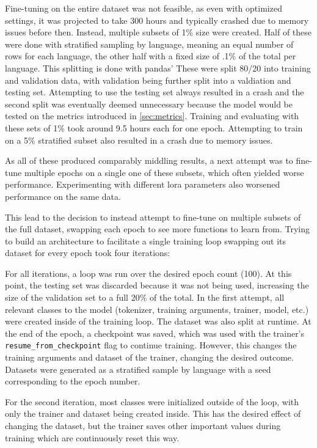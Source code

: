 Fine-tuning on the entire dataset was not feasible, as even with optimized settings, it was projected to take 300 hours and typically crashed due to memory issues before then.
Instead, multiple subsets of 1\% size were created.
Half of these were done with stratified sampling by language, meaning an equal number of rows for each language, the other half with a fixed size of .1\% of the total per language.
This splitting is done with pandas'
These were split 80/20 into training and validation data, with validation being further split into a valdiation and testing set.
Attempting to use the testing set always resulted in a crash and the second split was eventually deemed unnecessary because the model would be tested on the metrics introduced in \ref{sec:metrics}.
Training and evaluating with these sets of 1\% took around 9.5 hours each for one epoch.
Attempting to train on a 5\% stratified subset also resulted in a crash due to memory issues.

As all of these produced comparably middling results, a next attempt was to fine-tune multiple epochs on a single one of these subsets, which often yielded worse performance. Experimenting with different \ac{lora} parameters also worsened performance on the same data.

This lead to the decision to instead attempt to fine-tune on multiple subsets of the full dataset, swapping each epoch to see more functions to learn from.
Trying to build an architecture to facilitate a single training loop swapping out its dataset for every epoch took four iterations:

For all iterations, a loop was run over the desired epoch count (100).
At this point, the testing set was discarded because it was not being used, increasing the size of the validation set to a full 20\% of the total.
In the first attempt, all relevant classes to the model (tokenizer, training arguments, trainer, model, etc.) were created inside of the training loop.
The dataset was also split at runtime.
At the end of the epoch, a checkpoint was saved, which was used with the trainer's \texttt{resume\_from\_checkpoint} flag to continue training.
However, this changes the training arguments and dataset of the trainer, changing the desired outcome.
Datasets were generated as a stratified sample by language with a seed corresponding to the epoch number.

For the second iteration, most classes were initialized outside of the loop, with only the trainer and dataset being created inside.
This has the desired effect of changing the dataset, but the trainer saves other important values during training which are continuously reset this way.


